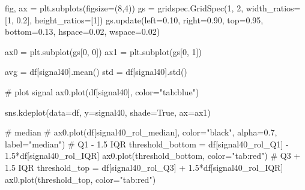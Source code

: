 \documentclass[
  letterpaper,
  DIV=11,
  numbers=noendperiod,
  oneside]{scrreprt}
\newenvironment{Shaded}{\begin{snugshade}}{\end{snugshade}}
\newcommand{\CommentTok}[1]{\textcolor[rgb]{0.37,0.37,0.37}{#1}}
\newcommand{\DecValTok}[1]{\textcolor[rgb]{0.68,0.00,0.00}{#1}}
\newcommand{\FloatTok}[1]{\textcolor[rgb]{0.68,0.00,0.00}{#1}}
\newcommand{\NormalTok}[1]{\textcolor[rgb]{0.00,0.23,0.31}{#1}}
\newcommand{\OperatorTok}[1]{\textcolor[rgb]{0.37,0.37,0.37}{#1}}
\newcommand{\StringTok}[1]{\textcolor[rgb]{0.13,0.47,0.30}{#1}}
\newcommand{\VariableTok}[1]{\textcolor[rgb]{0.07,0.07,0.07}{#1}}
\begin{document}
\begin{Shaded}
\begin{Highlighting}[]
\NormalTok{fig, ax }\OperatorTok{=}\NormalTok{ plt.subplots(figsize}\OperatorTok{=}\NormalTok{(}\DecValTok{8}\NormalTok{,}\DecValTok{4}\NormalTok{))}
\NormalTok{gs }\OperatorTok{=}\NormalTok{ gridspec.GridSpec(}\DecValTok{1}\NormalTok{, }\DecValTok{2}\NormalTok{, width\_ratios}\OperatorTok{=}\NormalTok{[}\DecValTok{1}\NormalTok{, }\FloatTok{0.2}\NormalTok{], height\_ratios}\OperatorTok{=}\NormalTok{[}\DecValTok{1}\NormalTok{])}
\NormalTok{gs.update(left}\OperatorTok{=}\FloatTok{0.10}\NormalTok{, right}\OperatorTok{=}\FloatTok{0.90}\NormalTok{, top}\OperatorTok{=}\FloatTok{0.95}\NormalTok{, bottom}\OperatorTok{=}\FloatTok{0.13}\NormalTok{,}
\NormalTok{          hspace}\OperatorTok{=}\FloatTok{0.02}\NormalTok{, wspace}\OperatorTok{=}\FloatTok{0.02}\NormalTok{)}

\NormalTok{ax0 }\OperatorTok{=}\NormalTok{ plt.subplot(gs[}\DecValTok{0}\NormalTok{, }\DecValTok{0}\NormalTok{])}
\NormalTok{ax1 }\OperatorTok{=}\NormalTok{ plt.subplot(gs[}\DecValTok{0}\NormalTok{, }\DecValTok{1}\NormalTok{])}

\NormalTok{avg }\OperatorTok{=}\NormalTok{ df[}\StringTok{\textquotesingle{}signal40\textquotesingle{}}\NormalTok{].mean()}
\NormalTok{std }\OperatorTok{=}\NormalTok{ df[}\StringTok{\textquotesingle{}signal40\textquotesingle{}}\NormalTok{].std()}

\CommentTok{\# plot signal}
\NormalTok{ax0.plot(df[}\StringTok{\textquotesingle{}signal40\textquotesingle{}}\NormalTok{], color}\OperatorTok{=}\StringTok{"tab:blue"}\NormalTok{)}

\NormalTok{sns.kdeplot(data}\OperatorTok{=}\NormalTok{df, y}\OperatorTok{=}\StringTok{\textquotesingle{}signal40\textquotesingle{}}\NormalTok{, shade}\OperatorTok{=}\VariableTok{True}\NormalTok{, ax}\OperatorTok{=}\NormalTok{ax1)}

\CommentTok{\# median}
\CommentTok{\# ax0.plot(df[\textquotesingle{}signal40\_rol\_median\textquotesingle{}], color="black", alpha=0.7, label="median")}
\CommentTok{\# Q1 {-} 1.5 IQR}
\NormalTok{threshold\_bottom }\OperatorTok{=}\NormalTok{ df[}\StringTok{\textquotesingle{}signal40\_rol\_Q1\textquotesingle{}}\NormalTok{] }\OperatorTok{{-}} \FloatTok{1.5}\OperatorTok{*}\NormalTok{df[}\StringTok{\textquotesingle{}signal40\_rol\_IQR\textquotesingle{}}\NormalTok{]}
\NormalTok{ax0.plot(threshold\_bottom, color}\OperatorTok{=}\StringTok{"tab:red"}\NormalTok{)}
\CommentTok{\# Q3 + 1.5 IQR}
\NormalTok{threshold\_top }\OperatorTok{=}\NormalTok{ df[}\StringTok{\textquotesingle{}signal40\_rol\_Q3\textquotesingle{}}\NormalTok{] }\OperatorTok{+} \FloatTok{1.5}\OperatorTok{*}\NormalTok{df[}\StringTok{\textquotesingle{}signal40\_rol\_IQR\textquotesingle{}}\NormalTok{]}
\NormalTok{ax0.plot(threshold\_top, color}\OperatorTok{=}\StringTok{"tab:red"}\NormalTok{)}


\end{Highlighting}
\end{Shaded}
\end{document}
